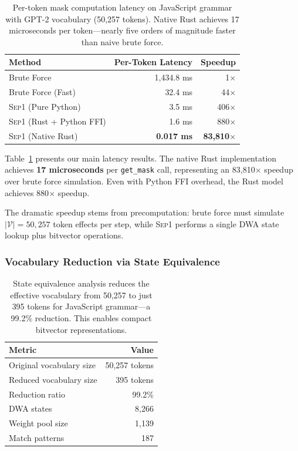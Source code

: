 \documentclass[11pt,a4paper]{article}
\newcommand{\vocab}{\mathcal{V}}
\newcommand{\sep}{\textsc{Sep1}}
\theoremstyle{plain}
\theoremstyle{definition}
\theoremstyle{remark}
\begin{document}
\begin{table}[t]
\centering
\begin{tabular}{lrr}
\toprule
\textbf{Method} & \textbf{Per-Token Latency} & \textbf{Speedup} \\
\midrule
Brute Force & 1,434.8 ms & 1$\times$ \\
Brute Force (Fast) & 32.4 ms & 44$\times$ \\
\sep{} (Pure Python) & 3.5 ms & 406$\times$ \\
\sep{} (Rust + Python FFI) & 1.6 ms & 880$\times$ \\
\sep{} (Native Rust) & \textbf{0.017 ms} & \textbf{83,810$\times$} \\
\bottomrule
\end{tabular}
\caption{Per-token mask computation latency on JavaScript grammar with GPT-2 vocabulary (50,257 tokens). Native Rust achieves 17 microseconds per token---nearly five orders of magnitude faster than naive brute force.}
\label{tab:latency}
\end{table}

Table~\ref{tab:latency} presents our main latency results. The native Rust implementation achieves \textbf{17 microseconds} per \texttt{get\_mask} call, representing an 83,810$\times$ speedup over brute force simulation. Even with Python FFI overhead, the Rust model achieves 880$\times$ speedup.

The dramatic speedup stems from precomputation: brute force must simulate $|\vocab| = 50{,}257$ token effects per step, while \sep{} performs a single DWA state lookup plus bitvector operations.

\subsubsection{Vocabulary Reduction via State Equivalence}

\begin{table}[t]
\centering
\begin{tabular}{lr}
\toprule
\textbf{Metric} & \textbf{Value} \\
\midrule
Original vocabulary size & 50,257 tokens \\
Reduced vocabulary size & 395 tokens \\
Reduction ratio & 99.2\% \\
\midrule
DWA states & 8,266 \\
Weight pool size & 1,139 \\
Match patterns & 187 \\
\bottomrule
\end{tabular}
\caption{State equivalence analysis reduces the effective vocabulary from 50,257 to just 395 tokens for JavaScript grammar---a 99.2\% reduction. This enables compact bitvector representations.}
\label{tab:equivalence}
\end{table}
\end{document}
